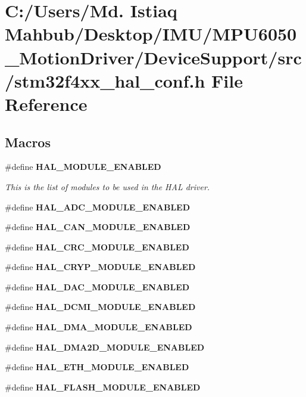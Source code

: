 \section{C\+:/\+Users/\+Md. Istiaq Mahbub/\+Desktop/\+I\+M\+U/\+M\+P\+U6050\+\_\+\+Motion\+Driver/\+Device\+Support/src/stm32f4xx\+\_\+hal\+\_\+conf.h File Reference}
\label{stm32f4xx__hal__conf_8h}
\subsection*{Macros}
\begin{DoxyCompactItemize}
\item 
\#define \textbf{ H\+A\+L\+\_\+\+M\+O\+D\+U\+L\+E\+\_\+\+E\+N\+A\+B\+L\+ED}
\begin{DoxyCompactList}\small\item\em This is the list of modules to be used in the H\+AL driver. \end{DoxyCompactList}\item 
\#define \textbf{ H\+A\+L\+\_\+\+A\+D\+C\+\_\+\+M\+O\+D\+U\+L\+E\+\_\+\+E\+N\+A\+B\+L\+ED}
\item 
\#define \textbf{ H\+A\+L\+\_\+\+C\+A\+N\+\_\+\+M\+O\+D\+U\+L\+E\+\_\+\+E\+N\+A\+B\+L\+ED}
\item 
\#define \textbf{ H\+A\+L\+\_\+\+C\+R\+C\+\_\+\+M\+O\+D\+U\+L\+E\+\_\+\+E\+N\+A\+B\+L\+ED}
\item 
\#define \textbf{ H\+A\+L\+\_\+\+C\+R\+Y\+P\+\_\+\+M\+O\+D\+U\+L\+E\+\_\+\+E\+N\+A\+B\+L\+ED}
\item 
\#define \textbf{ H\+A\+L\+\_\+\+D\+A\+C\+\_\+\+M\+O\+D\+U\+L\+E\+\_\+\+E\+N\+A\+B\+L\+ED}
\item 
\#define \textbf{ H\+A\+L\+\_\+\+D\+C\+M\+I\+\_\+\+M\+O\+D\+U\+L\+E\+\_\+\+E\+N\+A\+B\+L\+ED}
\item 
\#define \textbf{ H\+A\+L\+\_\+\+D\+M\+A\+\_\+\+M\+O\+D\+U\+L\+E\+\_\+\+E\+N\+A\+B\+L\+ED}
\item 
\#define \textbf{ H\+A\+L\+\_\+\+D\+M\+A2\+D\+\_\+\+M\+O\+D\+U\+L\+E\+\_\+\+E\+N\+A\+B\+L\+ED}
\item 
\#define \textbf{ H\+A\+L\+\_\+\+E\+T\+H\+\_\+\+M\+O\+D\+U\+L\+E\+\_\+\+E\+N\+A\+B\+L\+ED}
\item 
\#define \textbf{ H\+A\+L\+\_\+\+F\+L\+A\+S\+H\+\_\+\+M\+O\+D\+U\+L\+E\+\_\+\+E\+N\+A\+B\+L\+ED}

\end{DoxyCompactItemize}
